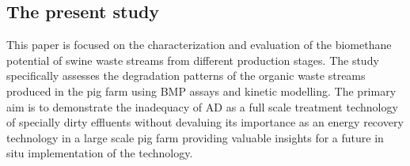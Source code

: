 \subsection{The present study}
This paper is focused on the characterization and evaluation of the biomethane potential of swine waste streams from different production stages. The study specifically assesses the degradation patterns of the organic waste streams produced in the pig farm using BMP assays and kinetic modelling. The primary aim is to demonstrate the inadequacy of AD as a full scale treatment technology of specially dirty effluents without devaluing its importance as an energy recovery technology in a large scale pig farm providing valuable insights for a future in situ implementation of the technology.